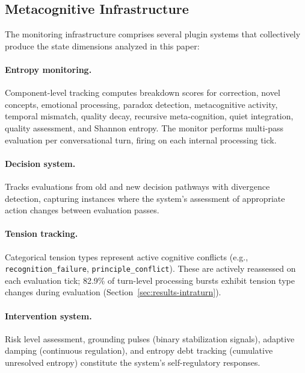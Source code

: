 \documentclass[twoside,11pt]{article}
\begin{document}
\subsection{Metacognitive Infrastructure}
\label{sec:arch-metacognitive}

The monitoring infrastructure comprises several plugin systems that collectively
produce the state dimensions analyzed in this paper:

\paragraph{Entropy monitoring.} Component-level tracking computes breakdown
scores for correction, novel concepts, emotional processing, paradox detection,
metacognitive activity, temporal mismatch, quality decay, recursive
meta-cognition, quiet integration, quality assessment, and Shannon entropy.
The monitor performs multi-pass evaluation per conversational turn, firing on
each internal processing tick.

\paragraph{Decision system.} Tracks evaluations from old and new decision
pathways with divergence detection, capturing instances where the system's
assessment of appropriate action changes between evaluation passes.

\paragraph{Tension tracking.} Categorical tension types represent active
cognitive conflicts (e.g., \texttt{recognition\_failure},
\texttt{principle\_conflict}). These are actively reassessed on each evaluation
tick; 82.9\% of turn-level processing bursts exhibit tension type changes
during evaluation (Section~\ref{sec:results-intraturn}).

\paragraph{Intervention system.} Risk level assessment, grounding pulses (binary
stabilization signals), adaptive damping (continuous regulation), and entropy
debt tracking (cumulative unresolved entropy) constitute the system's
self-regulatory responses.
\end{document}
